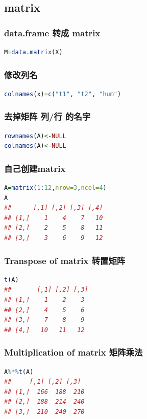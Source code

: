 \documentclass[11pt,a4paper]{article}
\begin{document}
\subsection{matrix}
\subsubsection{data.frame 转成 matrix}
\begin{lstlisting}[language=R]
M=data.matrix(X)
\end{lstlisting}

\subsubsection{修改列名}
\begin{lstlisting}[language=R]
colnames(x)=c("t1", "t2", "hum")
\end{lstlisting}

\subsubsection{去掉矩阵 列/行 的名字}
\begin{lstlisting}[language=R]
rownames(A)<-NULL
colnames(A)<-NULL
\end{lstlisting}

\subsubsection{自己创建matrix}
\begin{lstlisting}[language=R]
A=matrix(1:12,nrow=3,ncol=4)
A
##      [,1] [,2] [,3] [,4]
## [1,]    1    4    7   10
## [2,]    2    5    8   11
## [3,]    3    6    9   12
\end{lstlisting}
\subsubsection{Transpose of matrix 转置矩阵}
\begin{lstlisting}[language=R]
t(A)
##       [,1] [,2] [,3]
## [1,]    1    2    3
## [2,]    4    5    6
## [3,]    7    8    9
## [4,]   10   11   12
\end{lstlisting}
\subsubsection{Multiplication of matrix 矩阵乘法}
\begin{lstlisting}[language=R]
A%*%t(A)
##     [,1] [,2] [,3]
## [1,]  166  188  210
## [2,]  188  214  240
## [3,]  210  240  270
\end{lstlisting}
\end{document}
